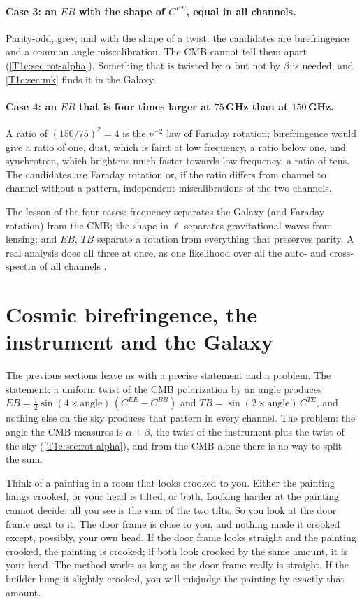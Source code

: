\paragraph{Case 3: an $EB$ with the shape of $C^{EE}$, equal in all channels.} Parity-odd, grey, and with the shape of a twist: the candidates are birefringence and a common angle miscalibration. The CMB cannot tell them apart (\cref{T1c:sec:rot-alpha}). Something that is twisted by $\alpha$ but not by $\beta$ is needed, and \cref{T1c:sec:mk} finds it in the Galaxy.

\paragraph{Case 4: an $EB$ that is four times larger at $75\,$GHz than at $150\,$GHz.} A ratio of $(150/75)^2=4$ is the $\nu^{-2}$ law of Faraday rotation; birefringence would give a ratio of one, dust, which is faint at low frequency, a ratio below one, and synchrotron, which brightens much faster towards low frequency, a ratio of tens. The candidates are Faraday rotation or, if the ratio differs from channel to channel without a pattern, independent miscalibrations of the two channels.

The lesson of the four cases: frequency separates the Galaxy (and Faraday rotation) from the CMB; the shape in $\ell$ separates gravitational waves from lensing; and $EB$, $TB$ separate a rotation from everything that preserves parity. A real analysis does all three at once, as one likelihood over all the auto- and cross-spectra of all channels \cite{BICEPKeck2021}.
\section{Cosmic birefringence, the instrument and the Galaxy}
\label{T1c:sec:biref}

The previous sections leave us with a precise statement and a problem. The statement: a uniform twist of the CMB polarization by an angle produces $EB=\frac12\sin(4\times\text{angle})\,(C^{EE}-C^{BB})$ and $TB=\sin(2\times\text{angle})\,C^{TE}$, and nothing else on the sky produces that pattern in every channel. The problem: the angle the CMB measures is $\alpha+\beta$, the twist of the instrument plus the twist of the sky (\cref{T1c:sec:rot-alpha}), and from the CMB alone there is no way to split the sum.

Think of a painting in a room that looks crooked to you. Either the painting hangs crooked, or your head is tilted, or both. Looking harder at the painting cannot decide: all you see is the sum of the two tilts. So you look at the door frame next to it. The door frame is close to you, and nothing made it crooked except, possibly, your own head. If the door frame looks straight and the painting crooked, the painting is crooked; if both look crooked by the same amount, it is your head. The method works as long as the door frame really is straight. If the builder hung it slightly crooked, you will misjudge the painting by exactly that amount.

